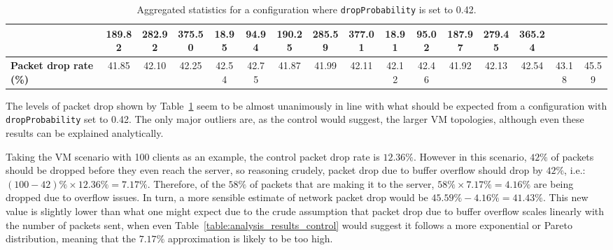 \begin{table}[!h]
{\begin{tabular}{|l|ccccc|ccccc|ccccc|}
            & \multicolumn{1}{c|}{189.82}
            & \multicolumn{1}{c|}{282.92}
            & \multicolumn{1}{c|}{375.50}
            & \multicolumn{1}{c|}{18.95}
            & \multicolumn{1}{c|}{94.94}
            & \multicolumn{1}{c|}{190.25}
            & \multicolumn{1}{c|}{285.59}
            & \multicolumn{1}{c|}{377.01}
            & \multicolumn{1}{c|}{18.91}
            & \multicolumn{1}{c|}{95.02}
            & \multicolumn{1}{c|}{187.97}
            & \multicolumn{1}{c|}{279.45}
            & \multicolumn{1}{c|}{365.24}
            \\ \hline
            \textbf{Packet drop rate (\%)} & \multicolumn{1}{c|}{41.85} & \multicolumn{1}{c|}{42.10}
            & \multicolumn{1}{c|}{42.25}
            & \multicolumn{1}{c|}{42.54}
            & \multicolumn{1}{c|}{42.75}
            & \multicolumn{1}{c|}{41.87}
            & \multicolumn{1}{c|}{41.99}
            & \multicolumn{1}{c|}{42.11}
            & \multicolumn{1}{c|}{42.12}
            & \multicolumn{1}{c|}{42.46}
            & \multicolumn{1}{c|}{41.92}
            & \multicolumn{1}{c|}{42.13}
            & \multicolumn{1}{c|}{42.54}
            & \multicolumn{1}{c|}{43.18}
            & \multicolumn{1}{c|}{45.59}
            \\ \hline
        \end{tabular}
    }
    \caption{Aggregated statistics for a configuration where \texttt{dropProbability} is set to 0.42.}
    \label{table:analysis_results_drop}
\end{table}

The levels of packet drop shown by Table~\ref{table:analysis_results_drop} seem to be almost unanimously in line with
what should be expected from a configuration with \texttt{dropProbability} set to 0.42. The only major outliers are,
as the control would suggest, the larger VM topologies, although even these results can be explained analytically.

Taking the VM scenario with 100 clients as an example, the control packet drop rate is $12.36\%$. However in this
scenario, $42\%$ of packets should be dropped before they even reach the server, so reasoning crudely, packet drop
due to buffer overflow should drop by $42\%$, i.e.: $(100 - 42)\% \times 12.36\% = 7.17\%$. Therefore, of the $58\%$
of packets that are making it to the server, $58\% \times 7.17\% = 4.16\%$ are being dropped due to overflow issues.
In turn, a more sensible estimate of network packet drop would be $45.59\% - 4.16\% = 41.43\%$. This new value is
slightly lower than what one might expect due to the crude assumption that packet drop due to buffer overflow scales
linearly with the number of packets sent, when even Table~\ref{table:analysis_results_control} would suggest it
follows a more exponential or Pareto distribution, meaning that the $7.17\%$ approximation is likely to be too high.

